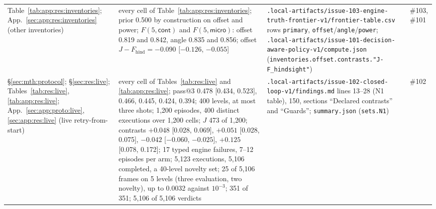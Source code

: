 {\begin{revblock}
\begin{longtable}{@{}>{\raggedright\arraybackslash}p{}>{\raggedright\arraybackslash}p{}>{\raggedright\arraybackslash}p{}>{\raggedright\arraybackslash}p{}@{}}
Table~\ref{tab:app:res:inventories}; App.~\ref{sec:app:res:inventories} (other inventories) & every cell of Table~\ref{tab:app:res:inventories}; prior 0.500 by construction on offset and power; $F(5,\textsf{cont})$ and $F(5,\textsf{micro})$: offset 0.819 and 0.842, angle 0.835 and 0.856; offset $J-F_{\mathrm{hind}}=-0.090$ [$-0.126$, $-0.055$] & \nolinkurl{.local-artifacts/issue-103-engine-truth-frontier-v1/frontier-table.csv} rows \texttt{primary}, \texttt{offset}/\texttt{angle}/\texttt{power}; \nolinkurl{.local-artifacts/issue-101-decision-aware-policy-v1/compute.json} (\nolinkurl{inventories.offset.contrasts."J-F_hindsight"}) & \#103, \#101 \\
\S\ref{sec:mth:protocol}; \S\ref{sec:res:live}; Tables~\ref{tab:res:live}, \ref{tab:app:res:live}; App.~\ref{sec:app:proto:live}, \ref{sec:app:res:live} (live retry-from-start) & every cell of Tables~\ref{tab:res:live} and \ref{tab:app:res:live}; pass@3 0.478 [0.434, 0.523], 0.466, 0.445, 0.424, 0.394; 400 levels, at most three shots; 1,200 episodes, 400 distinct executions over 1,200 cells; $J$ 473 of 1,200; contrasts $+0.048$ [0.028, 0.069], $+0.051$ [0.028, 0.075], $-0.042$ [$-0.060$, $-0.025$], $+0.125$ [0.078, 0.172]; 17 typed engine failures, 7--12 episodes per arm; 5,123 executions, 5,106 completed, a 40-level novelty set; 25 of 5,106 frames on 5 levels (three evaluation, two novelty), up to 0.0032 against $10^{-3}$; 351 of 351; 5,106 of 5,106 verdicts & \nolinkurl{.local-artifacts/issue-102-closed-loop-v1/findings.md} lines 13--28 (N1 table), 150, sections ``Declared contrasts'' and ``Guards''; \nolinkurl{summary.json} (\nolinkurl{sets.N1}) & \#102 \\

\end{longtable}
\end{revblock}}
